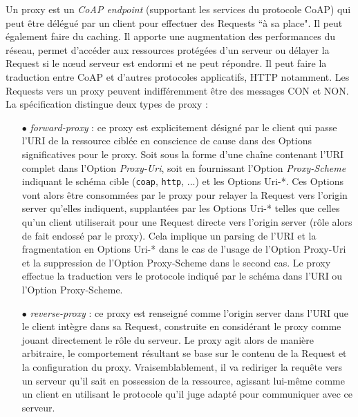 \documentclass[]{report}
\begin{document}
\par Un proxy est un \textit{CoAP endpoint} (supportant les services du protocole CoAP) qui peut être délégué par un client pour effectuer des Requests ``à sa place". Il peut également faire du caching. Il apporte une augmentation des performances du réseau, permet d'accéder aux ressources protégées d'un serveur ou délayer la Request si le nœud serveur est endormi et ne peut répondre. Il peut faire la traduction entre CoAP et d'autres protocoles applicatifs, HTTP notamment. Les Requests vers un proxy peuvent indifféremment être des messages CON et NON. La spécification \cite{rfc7252} distingue deux types de proxy :
\vspace{0.2cm}
\begin{itemize}
\item[$\bullet$] \textit{forward-proxy} : ce proxy est explicitement désigné par le client qui passe l'URI de la ressource ciblée en conscience de cause dans des Options significatives pour le proxy. Soit sous la forme d'une chaîne contenant l'URI complet dans l'Option \textit{Proxy-Uri}, soit en fournissant l'Option \textit{Proxy-Scheme} indiquant le schéma cible (\texttt{coap}, \texttt{http}, ...) et les Options Uri-*. Ces Options vont alors être consommées par le proxy pour relayer la Request vers l'origin server qu'elles indiquent, supplantées par les Options Uri-* telles que celles qu'un client utiliserait pour une Request directe vers l'origin server (rôle alors de fait endossé par le proxy). Cela implique un parsing de l'URI et la fragmentation en Options Uri-* dans le cas de l'usage de l'Option Proxy-Uri et la suppression de l'Option Proxy-Scheme dans le second cas. Le proxy effectue la traduction vers le protocole indiqué par le schéma dans l'URI ou l'Option Proxy-Scheme.
\vspace{0.2cm}
\item[$\bullet$] \textit{reverse-proxy} : ce proxy est renseigné comme l'origin server dans l'URI que le client intègre dans sa Request, construite en considérant le proxy comme jouant directement le rôle du serveur. Le proxy agit alors de manière arbitraire, le comportement résultant se base sur le contenu de la Request et la configuration du proxy. Vraisemblablement, il va rediriger la requête vers un serveur qu'il sait en possession de la ressource, agissant lui-même comme un client en utilisant le protocole qu'il juge adapté pour communiquer avec ce serveur.
\end{itemize}
 
\newpage
\end{document}
